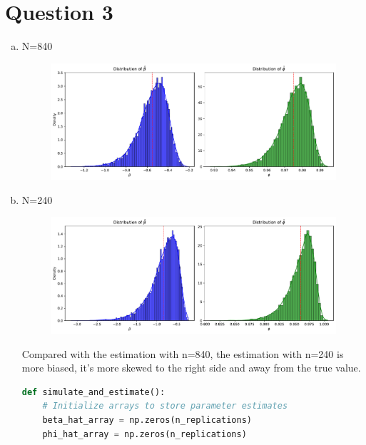 
\section*{Question 3}

\begin{enumerate}[(a)]
    \item
    N=840\\
    \begin{figure}[h]
        \centering
        \includegraphics[width=0.9\linewidth]{Out/EX3-1.pdf}
        
    \end{figure}

  \item
    N=240\\
    \begin{figure}[h]
        \centering
        \includegraphics[width=0.9\linewidth]{Out/EX3-2.pdf}
        
    \end{figure}
Compared with the estimation with n=840, the estimation with n=240 is more biased, it's more skewed to the right side and away from the true value.



\begin{lstlisting}[language=Python, caption=Python code for simulation, label={lst:q1a}, escapechar=|, frame=single, basicstyle=\small, showstringspaces=false, captionpos=b, breaklines=true, showspaces=false, showtabs=false, keywordstyle=\color{blue}, commentstyle=\color{gray}]
    def simulate_and_estimate():
    # Initialize arrays to store parameter estimates
    beta_hat_array = np.zeros(n_replications)
    phi_hat_array = np.zeros(n_replications)


\end{lstlisting}
\end{enumerate}
